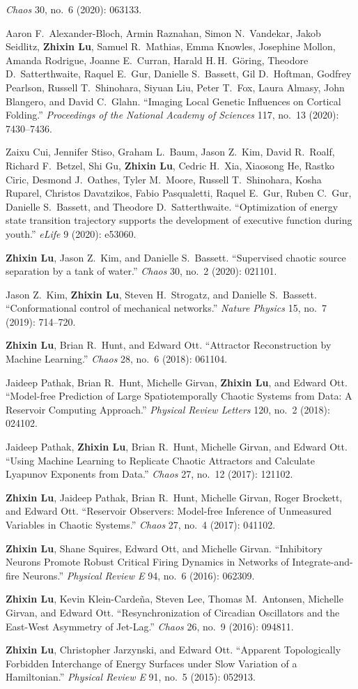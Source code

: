 \documentclass[11pt]{article}
\newenvironment{publist}{%
  \begin{list}{}{%
    \setlength{\leftmargin}{2.4em}%
    \setlength{\labelwidth}{1.9em}%
    \setlength{\labelsep}{0.5em}%
    \setlength{\itemsep}{5pt}%
    \setlength{\parsep}{0pt}%
    \setlength{\topsep}{4pt}%
    \interlinepenalty=10000}}%
  {\end{list}}
\newcommand{\pub}[1]{\item[\textbf{#1.}]}
\begin{document}
\begin{publist}
  \emph{Chaos} 30, no.\ 6 (2020): 063133.
\pub{11} Aaron F.\ Alexander-Bloch, Armin Raznahan, Simon N.\ Vandekar, Jakob Seidlitz,
  \textbf{Zhixin Lu}, Samuel R.\ Mathias, Emma Knowles, Josephine Mollon, Amanda Rodrigue,
  Joanne E.\ Curran, Harald H.\,H.\ Göring, Theodore D.\ Satterthwaite, Raquel E.\ Gur,
  Danielle S.\ Bassett, Gil D.\ Hoftman, Godfrey Pearlson, Russell T.\ Shinohara,
  Siyuan Liu, Peter T.\ Fox, Laura Almasy, John Blangero, and David C.\ Glahn.
  ``Imaging Local Genetic Influences on Cortical Folding.''
  \emph{Proceedings of the National Academy of Sciences} 117, no.\ 13 (2020): 7430--7436.
\pub{10} Zaixu Cui, Jennifer Stiso, Graham L.\ Baum, Jason Z.\ Kim, David R.\ Roalf,
  Richard F.\ Betzel, Shi Gu, \textbf{Zhixin Lu}, Cedric H.\ Xia, Xiaosong He, Rastko Ciric,
  Desmond J.\ Oathes, Tyler M.\ Moore, Russell T.\ Shinohara, Kosha Ruparel,
  Christos Davatzikos, Fabio Pasqualetti, Raquel E.\ Gur, Ruben C.\ Gur,
  Danielle S.\ Bassett, and Theodore D.\ Satterthwaite. ``Optimization of energy state
  transition trajectory supports the development of executive function during youth.''
  \emph{eLife} 9 (2020): e53060.
\pub{9} \textbf{Zhixin Lu}, Jason Z.\ Kim, and Danielle S.\ Bassett.
  ``Supervised chaotic source separation by a tank of water.''
  \emph{Chaos} 30, no.\ 2 (2020): 021101.
\pub{8} Jason Z.\ Kim, \textbf{Zhixin Lu}, Steven H.\ Strogatz, and Danielle S.\ Bassett.
  ``Conformational control of mechanical networks.'' \emph{Nature Physics} 15, no.\ 7
  (2019): 714--720.
\pub{7} \textbf{Zhixin Lu}, Brian R.\ Hunt, and Edward Ott. ``Attractor Reconstruction
  by Machine Learning.'' \emph{Chaos} 28, no.\ 6 (2018): 061104.
\pub{6} Jaideep Pathak, Brian R.\ Hunt, Michelle Girvan, \textbf{Zhixin Lu}, and Edward Ott.
  ``Model-free Prediction of Large Spatiotemporally Chaotic Systems from Data: A Reservoir
  Computing Approach.'' \emph{Physical Review Letters} 120, no.\ 2 (2018): 024102.
\pub{5} Jaideep Pathak, \textbf{Zhixin Lu}, Brian R.\ Hunt, Michelle Girvan, and Edward Ott.
  ``Using Machine Learning to Replicate Chaotic Attractors and Calculate Lyapunov
  Exponents from Data.'' \emph{Chaos} 27, no.\ 12 (2017): 121102.
\pub{4} \textbf{Zhixin Lu}, Jaideep Pathak, Brian R.\ Hunt, Michelle Girvan, Roger Brockett,
  and Edward Ott. ``Reservoir Observers: Model-free Inference of Unmeasured Variables in
  Chaotic Systems.'' \emph{Chaos} 27, no.\ 4 (2017): 041102.
\pub{3} \textbf{Zhixin Lu}, Shane Squires, Edward Ott, and Michelle Girvan.
  ``Inhibitory Neurons Promote Robust Critical Firing Dynamics in Networks of
  Integrate-and-fire Neurons.'' \emph{Physical Review E} 94, no.\ 6 (2016): 062309.
\pub{2} \textbf{Zhixin Lu}, Kevin Klein-Cardeña, Steven Lee, Thomas M.\ Antonsen,
  Michelle Girvan, and Edward Ott. ``Resynchronization of Circadian Oscillators and the
  East-West Asymmetry of Jet-Lag.'' \emph{Chaos} 26, no.\ 9 (2016): 094811.
\pub{1} \textbf{Zhixin Lu}, Christopher Jarzynski, and Edward Ott. ``Apparent Topologically
  Forbidden Interchange of Energy Surfaces under Slow Variation of a Hamiltonian.''
  \emph{Physical Review E} 91, no.\ 5 (2015): 052913.
\end{publist}
\end{document}
